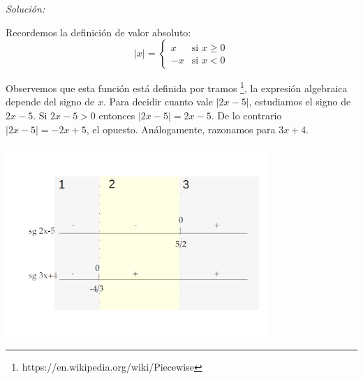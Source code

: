 \documentclass[10pt,a4paper]{article}
\begin{document}
\noindent
\emph{Solución:}

\noindent
Recordemos la definición de valor absoluto:
\begin{equation*}
  \vert x \vert =
  \begin{cases}
    x & \mbox{si } x\geq 0 \\
   -x & \mbox{si } x < 0
  \end{cases}
\end{equation*}

\noindent
Observemos que esta función está definida por tramos
\footnote{https://en.wikipedia.org/wiki/Piecewise},
la expresión algebraica depende del signo de $x$.
Para decidir cuanto vale $|2x - 5|$, estudiamos el signo de $2x-5$.
Si $2x-5>0$ entonces $|2x-5| = 2x-5$. De lo contrario $|2x-5| = -2x+5$,
el opuesto. Análogamente, razonamos para $ 3x+4$.

\begin{center}
\includegraphics[width=100mm]{signo}
\end{center}
\end{document}
